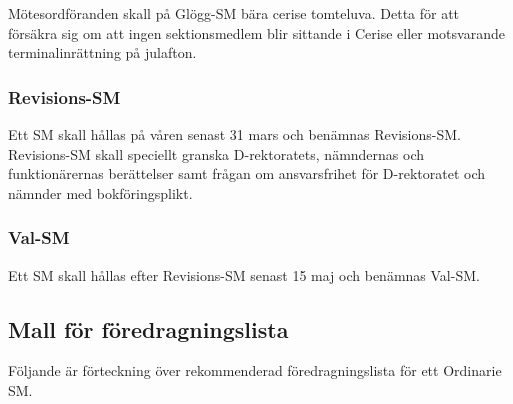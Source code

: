 \documentclass{dgovdoc}
\begin{document}
Mötesordföranden skall på Glögg-SM bära cerise tomteluva. Detta för att
försäkra sig om att ingen sektionsmedlem blir sittande i Cerise eller
motsvarande terminalinrättning på julafton.

\subsubsection{Revisions-SM}

Ett SM skall hållas på våren senast 31 mars och benämnas Revisions-SM.
Revisions-SM skall speciellt granska D-rektoratets, nämndernas och
funktionärernas berättelser samt frågan om ansvarsfrihet för D-rektoratet och
nämnder med bokföringsplikt.

\subsubsection{Val-SM}

Ett SM skall hållas efter Revisions-SM senast 15 maj och benämnas Val-SM.

\subsection{Mall för föredragningslista}

Följande är förteckning över rekommenderad föredragningslista för ett Ordinarie
SM.
\end{document}
